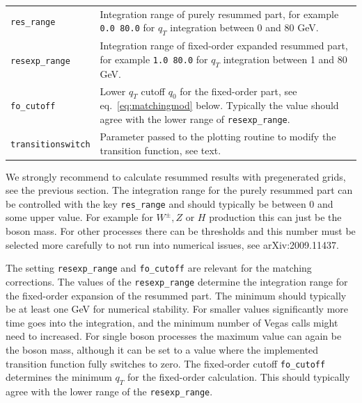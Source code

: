 \begin{longtable}[]{@{}ll@{}}
\begin{minipage}[t]{0.24\columnwidth}
		\texttt{res\_range}\strut
	\end{minipage} & \begin{minipage}[t]{0.71\columnwidth}\raggedright
		Integration range of purely resummed part, for example \texttt{0.0 80.0}
		for $q_T$ integration between 0 and 80 GeV.\strut
	\end{minipage}\tabularnewline
	\begin{minipage}[t]{0.24\columnwidth}\raggedright
		\texttt{resexp\_range}\strut
	\end{minipage} & \begin{minipage}[t]{0.71\columnwidth}\raggedright
		Integration range of fixed-order expanded resummed part, for example
		\texttt{1.0 80.0} for $q_T$ integration between 1 and 80 GeV.\strut
	\end{minipage}\tabularnewline
	\begin{minipage}[t]{0.24\columnwidth}\raggedright
		\texttt{fo\_cutoff}\strut
	\end{minipage} & \begin{minipage}[t]{0.71\columnwidth}\raggedright
		Lower $q_T$ cutoff $q_0$ for the fixed-order part, see eq.~\eqref{eq:matchingmod} below. 
		Typically the value should agree with the lower range of \texttt{resexp\_range}.\strut
	\end{minipage}\tabularnewline
	\begin{minipage}[t]{0.24\columnwidth}\raggedright
		\texttt{transitionswitch}\strut
	\end{minipage} & \begin{minipage}[t]{0.71\columnwidth}\raggedright
		Parameter passed to the plotting routine to modify the transition
		function, see text.\strut
	\end{minipage}\tabularnewline
\end{longtable}

We strongly recommend to calculate resummed results with pregenerated
grids, see the previous section.
The integration range for the purely resummed part can be controlled with the key
\texttt{res\_range} and should typically be between $0$ and some upper
value. For example for $W^\pm, Z$ or $H$ production this can just be
the boson mass. For other processes there can be thresholds and this
number must be selected more carefully to not run into numerical issues,
see arXiv:2009.11437.

The setting \texttt{resexp\_range} and \texttt{fo\_cutoff} are relevant
for the matching corrections. The values of the \texttt{resexp\_range}
determine the integration range for the fixed-order expansion of the
resummed part. The minimum should typically be at least one GeV for
numerical stability. For smaller values significantly more time goes
into the integration, and the minimum number of Vegas calls might need
to increased. For single boson processes the maximum value can again be
the boson mass, although it can be set to a value where the implemented
transition function fully switches to zero. The fixed-order cutoff
\texttt{fo\_cutoff} determines the minimum $q_T$ for the fixed-order
calculation. This should typically agree with the lower range of the
\texttt{resexp\_range}.


